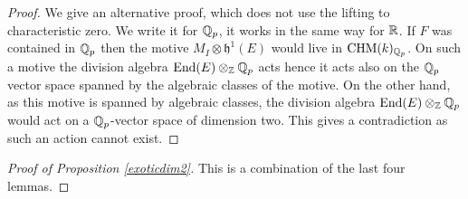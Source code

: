 \begin{proof}
We give an alternative proof, which does not use the lifting to characteristic zero. We write it for $\mathbb{Q}_p$, it works in the same way for $\mathbb{R}$. If $F$ was contained in $\mathbb{Q}_p$ then the motive $M_{I}  \otimes \mathfrak{h}^1(E)$  would live in $\mathrm{CHM} (k)_{\mathbb{Q}_p}$. On such a motive the division algebra $\textnormal{End}(E)\otimes_{\mathbb{Z}} \mathbb{Q}_p$ acts hence it acts also on the $\mathbb{Q}_p$ vector space spanned by the algebraic classes of the motive. On the other hand, as this motive is spanned by algebraic classes, the division algebra  $\textnormal{End}(E)\otimes_{\mathbb{Z}} \mathbb{Q}_p$  would act on a $\mathbb{Q}_p$-vector space  of dimension two. This gives a contradiction as such an  action cannot exist.
\end{proof}
\begin{proof}[Proof of Proposition \ref{exoticdim2}] This is a combination of the  last four lemmas.
\end{proof}

